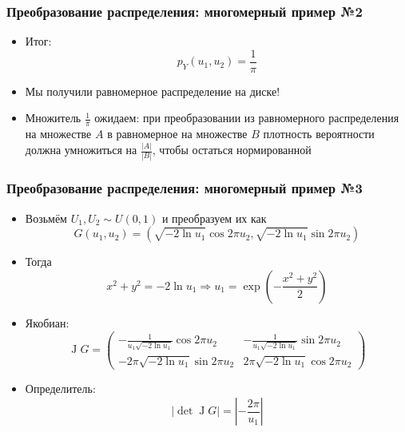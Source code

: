 \documentclass[10pt]{beamer}
\begin{document}
\begin{frame}[fragile]
\frametitle{Преобразование распределения: многомерный пример №2}
\begin{itemize}
\item Итог: \begin{equation*}p_Y(u_1, u_2) = \frac{1}{\pi}\end{equation*}
\pause
\item Мы получили равномерное распределение на диске!
\pause
\item Множитель \begin{math}\frac{1}{\pi}\end{math} ожидаем: при преобразовании из равномерного распределения на множестве \begin{math}A\end{math} в равномерное на множестве \begin{math}B\end{math} плотность вероятности должна умножиться на \begin{math}\frac{|A|}{|B|}\end{math}, чтобы остаться нормированной
\end{itemize}
\end{frame}

\begin{frame}[fragile]
\frametitle{Преобразование распределения: многомерный пример №3}
\begin{itemize}
\item Возьмём \begin{math}U_1, U_2 \sim U(0,1)\end{math} и преобразуем их как
\begin{equation*}
G(u_1, u_2) = (\sqrt{-2\ln u_1}\cos 2\pi u_2, \sqrt{-2\ln u_1}\sin 2\pi u_2)
\end{equation*}
\pause
\item Тогда
\begin{equation*}
x^2+y^2 = -2\ln u_1 \Longrightarrow u_1 = \exp\left(-\frac{x^2+y^2}{2}\right)
\end{equation*}
\pause
\item Якобиан:
\begin{equation*}
\operatorname J G = \begin{pmatrix}
-\frac{1}{u_1 \sqrt{-2\ln u_1}}\cos 2\pi u_2 & -\frac{1}{u_1 \sqrt{-2\ln u_1}}\sin 2\pi u_2 \\
-2\pi\sqrt{-2\ln u_1} \sin 2\pi u_2 & 2\pi\sqrt{-2\ln u_1} \cos 2\pi u_2
\end{pmatrix}
\end{equation*}
\pause
\item Определитель:
\begin{equation*}
|\det \operatorname J G| = \left|-\frac{2 \pi}{u_1}\right|
\end{equation*}
\end{itemize}
\end{frame}
\end{document}
